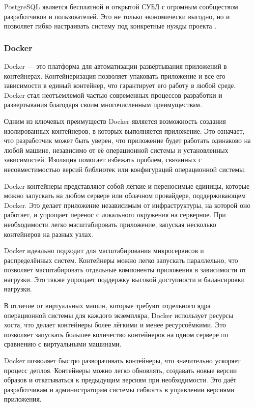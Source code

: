 \documentclass[diploma]{SCWorks}
\begin{document}
PostgreSQL является бесплатной и открытой СУБД с огромным
сообществом разработчиков и пользователей. Это не только 
экономически выгодно, но и позволяет гибко настраивать систему 
под конкретные нужды проекта \cite{postgresql}.

\subsubsection{Docker}

Docker — это платформа для автоматизации развёртывания приложений 
в контейнерах. Контейнеризация позволяет упаковать приложение и 
все его зависимости в единый контейнер, что гарантирует его работу 
в любой среде. Docker стал неотъемлемой частью современных процессов 
разработки и развертывания благодаря своим многочисленным преимуществам.

Одним из ключевых преимуществ Docker является возможность создания 
изолированных контейнеров, в которых выполняется приложение. 
Это означает, что разработчик может быть уверен, что приложение 
будет работать одинаково на любой машине, независимо от её операционной 
системы и установленных зависимостей. Изоляция помогает избежать 
проблем, связанных с несовместимостью версий библиотек или конфигураций 
операционной системы.
    
Docker-контейнеры представляют собой лёгкие и переносимые единицы, 
которые можно запускать на любом сервере или облачном провайдере, 
поддерживающем Docker. Это делает приложение независимым от 
инфраструктуры, на которой оно работает, и упрощает перенос с локального 
окружения на серверное. При необходимости легко масштабировать 
приложение, запуская несколько контейнеров на разных узлах.
    
Docker идеально подходит для масштабирования микросервисов и 
распределённых систем. Контейнеры можно легко запускать параллельно, 
что позволяет масштабировать отдельные компоненты приложения в 
зависимости от нагрузки. Это также упрощает поддержку высокой 
доступности и балансировки нагрузки.
    
В отличие от виртуальных машин, которые требуют отдельного ядра 
операционной системы для каждого экземпляра, Docker использует 
ресурсы хоста, что делает контейнеры более лёгкими и менее 
ресурсоёмкими. Это позволяет запускать большее количество контейнеров 
на одном сервере по сравнению с виртуальными машинами.
    
Docker позволяет быстро разворачивать контейнеры, что значительно ускоряет 
процесс деплоя. Контейнеры можно легко обновлять, создавать новые версии 
образов и откатываться к предыдущим версиям при необходимости. Это даёт 
разработчикам и администраторам системы гибкость в управлении версиями 
приложения.
    
\end{document}
